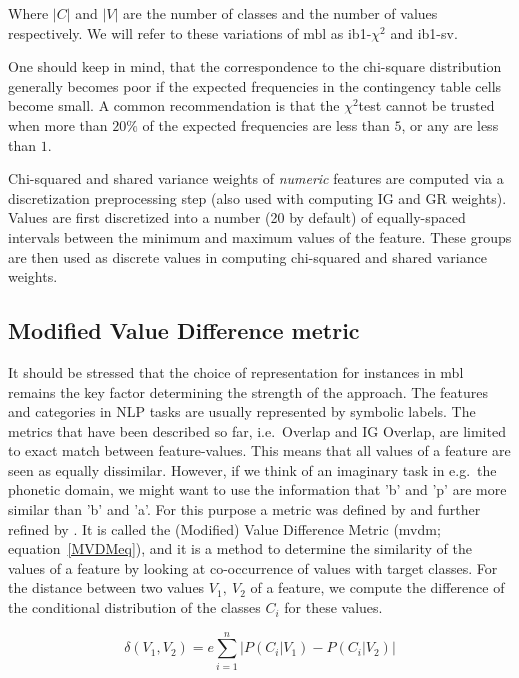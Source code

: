 \documentclass{report}
\newcommand{\chisq}{{$ \chi^2 $}}
\begin{document}
Where $|C|$ and $|V|$ are the number of classes and the number of values
respectively. We will refer to these variations of {\sc mbl} as {\sc
ib1-\chisq} and {\sc ib1-sv}.

One should keep in mind, that the correspondence to the chi-square
distribution generally becomes poor if the expected frequencies in the
contingency table cells become small. A common recommendation is that
the \chisq test cannot be trusted when more than $20\%$ of the
expected frequencies are less than $5$, or any are less than $1$.

Chi-squared and shared variance weights of {\em numeric}\/ features are
computed via a discretization preprocessing step (also used with
computing IG and GR weights). Values are first discretized into a
number (20 by default) of equally-spaced intervals between the
minimum and maximum values of the feature. These groups are then used
as discrete values in computing chi-squared and shared variance weights.

\subsection{Modified Value Difference metric}
\label{mvdm}

It should be stressed that the choice of representation for instances
in {\sc mbl} remains the key factor determining the strength of the
approach. The features and categories in NLP tasks are usually
represented by symbolic labels. The metrics that have been described
so far, i.e.~Overlap and IG Overlap, are limited to exact match
between feature-values. This means that all values of a feature are
seen as equally dissimilar. However, if we think of an imaginary task
in e.g.~the phonetic domain, we might want to use the information that
'b' and 'p' are more similar than 'b' and 'a'. For this purpose a
metric was defined by  and further refined by
. It is called the (Modified) Value Difference
Metric ({\sc mvdm}; equation~\ref{MVDMeq}), and it is a method to
determine the similarity of the values of a feature by looking at
co-occurrence of values with target classes. For the distance between
two values $V_{1},\ V_{2}$ of a feature, we compute the difference of
the conditional distribution of the classes $C_{i}$ for these values.

\begin{equation}
\delta(V_{1}, V_{2}) =e \sum_{i=1}^{n} \left| P(C_{i}|V_{1}) - P(C_{i}|V_{2})
\right|
\label{MVDMeq}
\end{equation}
\end{document}
